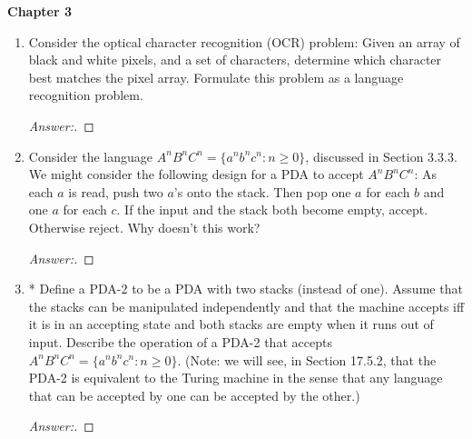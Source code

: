 \documentclass[10pt]{article}
\newcommand{\chtitle}[1]{\noindent \vspace{5mm}\textbf{Chapter #1}\vspace{3mm}}
\begin{document}
\chtitle{3}
\begin{enumerate}
\addtocounter{enumi}{1}


\item
Consider the optical character recognition (OCR) problem: Given an array of black and white pixels, and a set of characters, determine which character best matches the pixel array. Formulate this problem as a language recognition problem.
\begin{proof}[Answer:]
\end{proof}


\item
Consider the language $A^nB^nC^n = \{a^nb^nc^n: n \geq 0\}$, discussed in Section 3.3.3.  We might consider the following design for a PDA to accept $A^nB^nC^n$:  As each $a$ is read, push two $a$'s onto the stack.  Then pop one $a$ for each $b$ and one $a$ for each $c$.  If the input and the stack both become empty, accept.  Otherwise reject.  Why doesn’t this 
work?
\begin{proof}[Answer:]
\end{proof}


\item
* Define a PDA-2 to be a PDA with two stacks (instead of one).  Assume that the stacks can be manipulated independently and that the machine accepts iff it is in an accepting state and both stacks are empty when it runs out of input.  Describe the operation of a PDA-2 that accepts $A^nB^nC^n = \{a^nb^nc^n : n \geq 0\}$.  (Note: we will see, in Section 17.5.2, that the PDA-2 is equivalent to the Turing machine in the sense that any language that can be 
accepted by one can be accepted by the other.)
\begin{proof}[Answer:]
\end{proof}
\end{enumerate}
\end{document}
